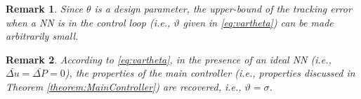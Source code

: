 \documentclass[1p,times]{elsarticle}
\newtheorem{remark}{Remark}
\begin{document}









\begin{remark}
{{\color{blue}}Since $\theta$ is a design parameter, the upper-bound of the tracking error when a NN is in the control loop (i.e., $\vartheta$ given in \eqref{eq:vartheta}) can be made arbitrarily small.}
\end{remark}


\begin{remark}
According to \eqref{eq:vartheta}, in the presence of an \textit{ideal} NN (i.e., $\bar{\Delta u}=\bar{\Delta P}=0$), the properties of the main controller (i.e., properties discussed in Theorem \ref{theorem:MainController}) are recovered, i.e., $\vartheta=\sigma$. 
\end{remark}


\end{document}
